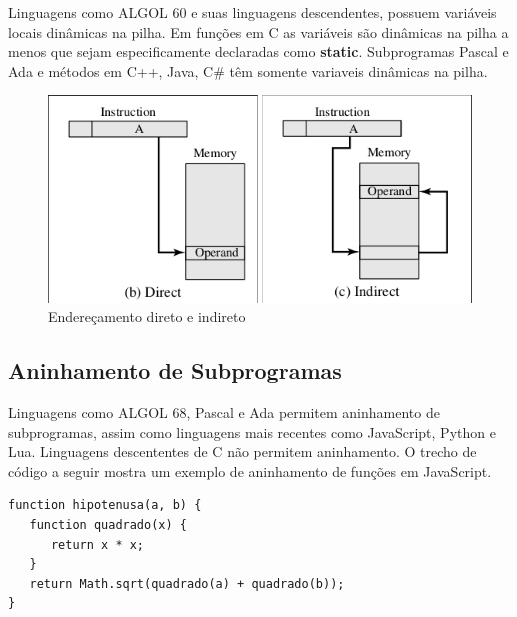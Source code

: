 Linguagens como ALGOL 60 e suas linguagens descendentes, possuem variáveis locais dinâmicas na pilha. Em funções em C as variáveis são dinâmicas na pilha a menos que sejam especificamente declaradas como \textbf{static}. Subprogramas Pascal e Ada e métodos em C++, Java, C\# têm somente variaveis dinâmicas na pilha. 

\begin{figure}[ht!]
 \centering
 \includegraphics[scale=0.65]{./imagens/enderecamento.png}
 \caption{Endereçamento direto e indireto \cite{stallings}}
\label{enderecamento}
\end{figure}

\subsection{Aninhamento de Subprogramas} 
\label{sub:aninhamento_de_subprogramas}
Linguagens como ALGOL 68, Pascal e Ada permitem aninhamento de subprogramas, assim como linguagens mais recentes como JavaScript, Python e Lua. Linguagens descententes de C não permitem aninhamento. O trecho de código a seguir mostra um exemplo de aninhamento de funções em JavaScript.

\begin{verbatim}
function hipotenusa(a, b) {
   function quadrado(x) {
      return x * x; 
   }
   return Math.sqrt(quadrado(a) + quadrado(b));
}
\end{verbatim}